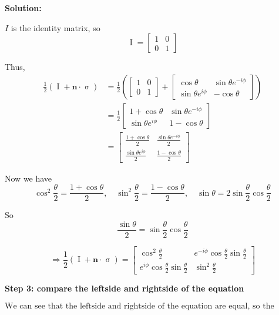 \documentclass[11pt]{article}
\newenvironment{solution}
{\par\noindent\textbf{Solution:}\par}
{\vspace{1em}}
\begin{document}
\begin{solution}
$I$ is the identity matrix, so \[\operatorname{I} = \begin{bmatrix}1 & 0 \\ 0 & 1\end{bmatrix}\]

Thus, 
\[\begin{aligned}
\frac{1}{2}\left(\operatorname{I} + \mathbf{n} \cdot \operatorname{\sigma}\right) &= \frac{1}{2} \left( \begin{bmatrix}1 & 0 \\ 0 & 1\end{bmatrix} + \begin{bmatrix}\cos{\theta} & \sin{\theta}e^{-i\phi} \\ \sin{\theta}e^{i\phi} & -\cos{\theta}\end{bmatrix} \right) \\
&= \frac{1}{2} \begin{bmatrix}1 + \cos{\theta} & \sin{\theta}e^{-i\phi} \\ \sin{\theta}e^{i\phi} & 1 - \cos{\theta}\end{bmatrix} \\
&= \begin{bmatrix}\frac{1 + \cos{\theta}}{2} & \frac{\sin{\theta}e^{-i\phi}}{2} \\ \frac{\sin{\theta}e^{i\phi}}{2} & \frac{1 - \cos{\theta}}{2}\end{bmatrix}
\end{aligned}\]

Now we have \[\cos^2{\frac{\theta}{2}} = \frac{1+\cos{\theta}}{2}, \quad \sin^2{\frac{\theta}{2}} = \frac{1-\cos{\theta}}{2}, \quad \sin{\theta} = 2\sin{\frac{\theta}{2}}\cos{\frac{\theta}{2}}\]

So 
\[\frac{\sin{\theta}}{2} = \sin{\frac{\theta}{2}}\cos{\frac{\theta}{2}}\]

\[\boxed{\Rightarrow \frac{1}{2}\left(\operatorname{I} + \mathbf{n} \cdot \operatorname{\sigma}\right) = \begin{bmatrix}\cos^2{\frac{\theta}{2}} & e^{-i\phi}\cos{\frac{\theta}{2}}\sin{\frac{\theta}{2}} \\ e^{i\phi}\cos{\frac{\theta}{2}}\sin{\frac{\theta}{2}} & \sin^2{\frac{\theta}{2}}\end{bmatrix}}\]

\textbf{Step 3: compare the leftside and rightside of the equation}

\[\boxed{\text{We can see that the leftside and rightside of the equation are equal, so the equation is verified.}}\]

\end{solution}
\end{document}
